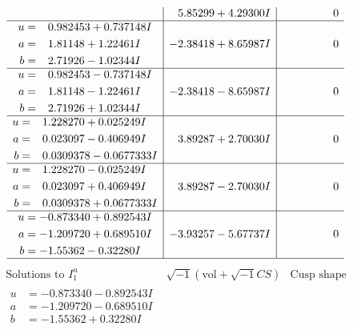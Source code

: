 \documentclass[1p]{elsarticle_modified}
\theoremstyle{definition}
\newcommand{\I}{\sqrt{-1}}
\begin{document}
$$\begin{array}{c|c|c}
 & \phantom{-}5.85299 + 4.29300 I & \phantom{-0.000000 } 0 \\ \hline\begin{aligned}
u &= \phantom{-}0.982453 + 0.737148 I \\
a &= \phantom{-}1.81148 + 1.22461 I \\
b &= \phantom{-}2.71926 - 1.02344 I\end{aligned}
 & -2.38418 + 8.65987 I & \phantom{-0.000000 } 0 \\ \hline\begin{aligned}
u &= \phantom{-}0.982453 - 0.737148 I \\
a &= \phantom{-}1.81148 - 1.22461 I \\
b &= \phantom{-}2.71926 + 1.02344 I\end{aligned}
 & -2.38418 - 8.65987 I & \phantom{-0.000000 } 0 \\ \hline\begin{aligned}
u &= \phantom{-}1.228270 + 0.025249 I \\
a &= \phantom{-}0.023097 - 0.406949 I \\
b &= \phantom{-}0.0309378 - 0.0677333 I\end{aligned}
 & \phantom{-}3.89287 + 2.70030 I & \phantom{-0.000000 } 0 \\ \hline\begin{aligned}
u &= \phantom{-}1.228270 - 0.025249 I \\
a &= \phantom{-}0.023097 + 0.406949 I \\
b &= \phantom{-}0.0309378 + 0.0677333 I\end{aligned}
 & \phantom{-}3.89287 - 2.70030 I & \phantom{-0.000000 } 0 \\ \hline\begin{aligned}
u &= -0.873340 + 0.892543 I \\
a &= -1.209720 + 0.689510 I \\
b &= -1.55362 - 0.32280 I\end{aligned}
 & -3.93257 - 5.67737 I & \phantom{-0.000000 } 0\\
 \hline 
 \end{array}$$\newpage$$\begin{array}{c|c|c}  
\text{Solutions to }I^u_{1}& \I (\text{vol} + \sqrt{-1}CS) & \text{Cusp shape}\\
 \hline 
\begin{aligned}
u &= -0.873340 - 0.892543 I \\
a &= -1.209720 - 0.689510 I \\
b &= -1.55362 + 0.32280 I\end{aligned}

\end{array}$$
\end{document}
